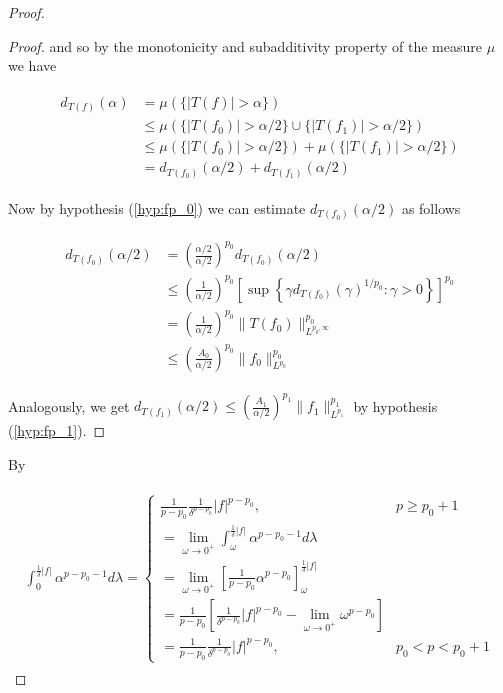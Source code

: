 \begin{proof}
\begin{proof}
and so by the monotonicity and subadditivity property of the measure $\mu$ we have

\begin{gather}
	\begin{aligned}
	d_{T(f)}(\alpha) &= \mu(\{\vert T(f)\vert > \alpha\})\\
	&\leq \mu(\{\vert T(f_0)\vert > \alpha/2 \} \cup \{\vert T(f_1)\vert > \alpha/2 \})\\
	&\leq \mu(\{\vert T(f_0) \vert > \alpha/2 \}) + \mu(\{\vert T(f_1)\vert > \alpha/2 \})\\
	&= d_{T(f_0)}(\alpha/2) + d_{T(f_1)}(\alpha/2)
	\label{est:T}
	\end{aligned}
\end{gather}

Now by hypothesis (\ref{hyp:fp_0}) we can estimate $d_{T(f_0)}(\alpha/2)$ as follows

\begin{gather}
	\begin{aligned}
		d_{T(f_0)}(\alpha/2) &= \left(\frac{\alpha/2}{\alpha/2}\right)^{p_0} d_{T(f_0)}(\alpha/2)\\
		&\leq \left(\frac{1}{\alpha/2}\right)^{p_0} \left[\sup\left\{ \gamma d_{T(f_0)}(\gamma)^{1/p_0}: \gamma > 0\right\}\right]^{p_0}\\
	 & = \left(\frac{1}{\alpha/2}\right)^{p_0} \|T(f_0)\|^{p_0}_{L^{p_0,\infty}}\\
	 & \leq \left(\frac{A_0}{\alpha/2}\right)^{p_0} \|f_0\|^{p_0}_{L^{p_0}}
	\label{est:p_0}
	\end{aligned}
\end{gather}

Analogously, we get  $d_{T(f_1)}(\alpha/2) \leq \left(\frac{A_1}{\alpha/2}\right)^{p_1} \|f_1\|^{p_1}_{L^{p_1}}\label{est:p_1}$ by hypothesis (\ref{hyp:fp_1}).
\end{proof}

By

\begin{gather}
	\begin{aligned}
		\int_0^{\frac{1}{\delta}\left| f\right|}\alpha^{p-p_0-1} d\lambda = 
			\begin{cases}
				\frac{1}{p-p_0}\frac{1}{\delta^{p-p_0}}\left| f \right|^{p - p_0}, & p \geq p_0 + 1\\
				=\lim_{\omega \to 0^+} \int_\omega^{\frac{1}{\delta}\left| f\right|}\alpha^{p-p_0-1} d\lambda\\
				= \lim_{\omega \to 0^+}\left[\frac{1}{p-p_0}\alpha^{p - p_0}\right]_\omega^{\frac{1}{\delta}\left| f\right|}\\
				= \frac{1}{p-p_0}\left[\frac{1}{\delta^{p-p_0}}\left| f \right|^{p - p_0} - \lim_{\omega \to 0^+} \omega^{p-p_0}\right]\\
				= \frac{1}{p-p_0}\frac{1}{\delta^{p-p_0}} \left| f\right|^{p - p_0}, & p_0 < p < p_0 + 1
			\end{cases}
	\end{aligned}
\end{gather}


\end{proof}
